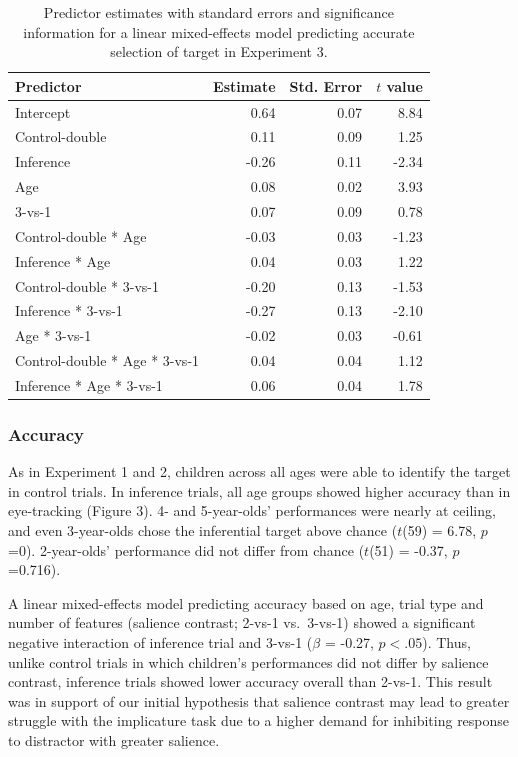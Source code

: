 \documentclass[a4paper,man,apacite,floatsintext]{apa6}
\begin{document}
\begin{table}[tb]
\centering
\begin{tabular}{lrrr}
 Predictor & Estimate & Std. Error & $t$ value \\ 
  \hline
Intercept & 0.64 & 0.07 & 8.84 \\ 
  Control-double & 0.11 & 0.09 & 1.25 \\ 
  Inference & -0.26 & 0.11 & -2.34 \\ 
  Age & 0.08 & 0.02 & 3.93 \\ 
  3-vs-1 & 0.07 & 0.09 & 0.78 \\ 
  Control-double * Age & -0.03 & 0.03 & -1.23 \\ 
  Inference * Age & 0.04 & 0.03 & 1.22 \\ 
  Control-double * 3-vs-1 & -0.20 & 0.13 & -1.53 \\ 
  Inference * 3-vs-1 & -0.27 & 0.13 & -2.10 \\ 
  Age * 3-vs-1 & -0.02 & 0.03 & -0.61 \\ 
  Control-double * Age * 3-vs-1 & 0.04 & 0.04 & 1.12 \\ 
  Inference * Age * 3-vs-1 & 0.06 & 0.04 & 1.78 \\ 
   \hline
\end{tabular}
\caption{Predictor estimates with standard errors and significance information for a linear mixed-effects model predicting accurate selection of target in Experiment 3.} 
\label{tab:exp3_tab}
\end{table}

\subsubsection{Accuracy}\label{accuracy-2}

As in Experiment 1 and 2, children across all ages were able to identify
the target in control trials. In inference trials, all age groups showed
higher accuracy than in eye-tracking (Figure 3). 4- and 5-year-olds'
performances were nearly at ceiling, and even 3-year-olds chose the
inferential target above chance (\(t\)(59) = 6.78, \(p\) =0).
2-year-olds' performance did not differ from chance (\(t\)(51) = -0.37,
\(p\) =0.716).

A linear mixed-effects model predicting accuracy based on age, trial
type and number of features (salience contrast; 2-vs-1 vs.~3-vs-1)
showed a significant negative interaction of inference trial and 3-vs-1
(\(\beta\) = -0.27, \(p <.05\)). Thus, unlike control trials in which
children's performances did not differ by salience contrast, inference
trials showed lower accuracy overall than 2-vs-1. This result was in
support of our initial hypothesis that salience contrast may lead to
greater struggle with the implicature task due to a higher demand for
inhibiting response to distractor with greater salience.
\end{document}
